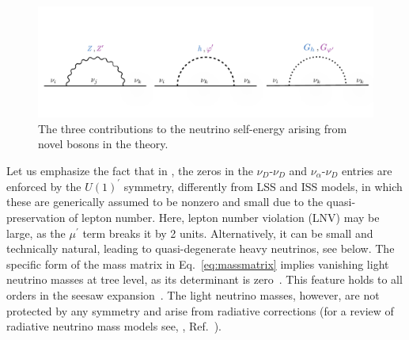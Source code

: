 \begin{figure}[t]
\centering\includegraphics[width=\textwidth]{Loop_masses.pdf}
\caption[Radiative corrections to neutrino masses.]{\label{fig:loops}The three contributions to the neutrino self-energy arising from novel bosons in the theory.}
\end{figure}

Let us emphasize the fact that in , the zeros in the $\nu_D$-$\nu_D$ and $\nu_\alpha$-$\nu_D$ entries are enforced by the $U(1)^\prime$ symmetry, differently from LSS and ISS models, in which these are generically assumed to be nonzero and small due to the quasi-preservation of lepton number. Here, lepton number violation (LNV) may be large, as the $\mu^\prime$ term breaks it by 2 units. Alternatively, it can be small and technically natural, leading to quasi-degenerate heavy neutrinos, see below. The specific form of the mass matrix in Eq.~\ref{eq:massmatrix} implies vanishing light neutrino masses at tree level, as its determinant is zero~\cite{Dev:2012sg,LopezPavon:2012zg}. This feature holds to all orders in the seesaw expansion~\cite{Grimus:2000vj,Adhikari:2010yt,LopezPavon:2012zg}. The light neutrino masses, however, are not protected by any symmetry and arise from radiative corrections (for a review of radiative neutrino mass models see, \eg, Ref.~\cite{Cai:2017jrq}). 


